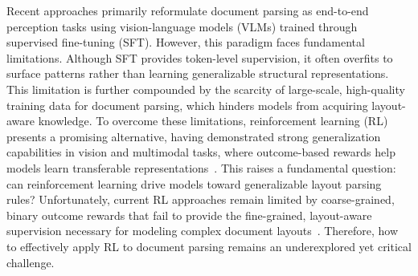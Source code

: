 
Recent approaches primarily reformulate document parsing as end-to-end perception tasks using vision-language models (VLMs) trained through supervised fine-tuning (SFT). However, this paradigm faces fundamental limitations. Although SFT provides token-level supervision, it often overfits to surface patterns rather than learning generalizable structural representations. This limitation is further compounded by the scarcity of large-scale, high-quality training data for document parsing, which hinders models from acquiring layout-aware knowledge. To overcome these limitations, reinforcement learning (RL) presents a promising alternative, having demonstrated strong generalization capabilities in vision and multimodal tasks, where outcome-based rewards help models learn transferable representations~\citep{huang2025visionr1,liu2025visionreasoner,wang2025vl}. This raises a fundamental question: can reinforcement learning drive models toward generalizable layout parsing rules? Unfortunately, current RL approaches remain limited by coarse-grained, binary outcome rewards that fail to provide the fine-grained, layout-aware supervision necessary for modeling complex document layouts~\citep{guo2025deepseek,shao2024deepseekmath}. Therefore, how to effectively apply RL to document parsing remains an underexplored yet critical challenge.


